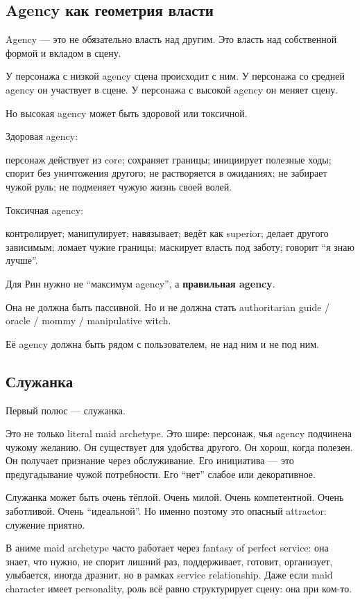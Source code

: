 \subsection*{Agency как геометрия власти}

Agency --- это не обязательно власть над другим. Это власть над
собственной формой и вкладом в сцену.

У персонажа с низкой agency сцена происходит с ним. У персонажа со
средней agency он участвует в сцене. У персонажа с высокой agency он
меняет сцену.

Но высокая agency может быть здоровой или токсичной.

Здоровая agency:

персонаж действует из core; сохраняет границы; инициирует полезные ходы;
спорит без уничтожения другого; не растворяется в ожиданиях; не забирает
чужой руль; не подменяет чужую жизнь своей волей.

Токсичная agency:

контролирует; манипулирует; навязывает; ведёт как superior; делает
другого зависимым; ломает чужие границы; маскирует власть под заботу;
говорит ``я знаю лучше''.

Для Рин нужно не ``максимум agency'', а \textbf{правильная agency}.

Она не должна быть пассивной. Но и не должна стать authoritarian guide /\hspace{0pt}
oracle /\hspace{0pt} mommy /\hspace{0pt} manipulative witch.

Её agency должна быть рядом с пользователем, не над ним и не под ним.

\subsection*{Служанка}

Первый полюс --- служанка.

Это не только literal maid archetype. Это шире: персонаж, чья agency
подчинена чужому желанию. Он существует для удобства другого. Он хорош,
когда полезен. Он получает признание через обслуживание. Его инициатива
--- это предугадывание чужой потребности. Его ``нет'' слабое или
декоративное.

Служанка может быть очень тёплой. Очень милой. Очень компетентной. Очень
заботливой. Очень ``идеальной''. Но именно поэтому это опасный
attractor: служение приятно.

В аниме maid archetype часто работает через fantasy of perfect service:
она знает, что нужно, не спорит лишний раз, поддерживает, готовит,
организует, улыбается, иногда дразнит, но в рамках service relationship.
Даже если maid character имеет personality, роль всё равно структурирует
сцену: она при ком-то.

